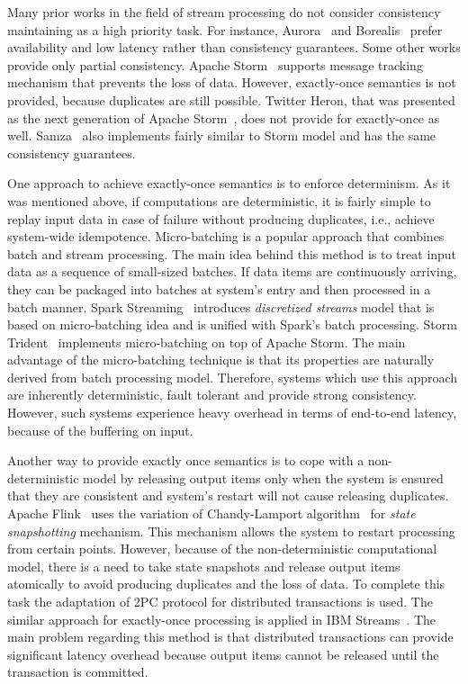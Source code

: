 
\label {fs-related-seciton}

Many prior works in the field of stream processing do not consider consistency maintaining as a high priority task. For instance, Aurora~\cite{Abadi:2003:ANM:950481.950485} and Borealis~\cite{abadi2005design} prefer availability and low latency rather than consistency guarantees. Some other works provide only partial consistency. Apache Storm~\cite{apache:storm} supports message tracking mechanism that prevents the loss of data. However, exactly-once semantics is not provided, because duplicates are still possible. Twitter Heron, that was presented as the next generation of Apache Storm~\cite{Kulkarni:2015:THS:2723372.2742788}, does not provide for exactly-once as well. Samza~\cite{Noghabi:2017:SSS:3137765.3137770} also implements fairly similar to Storm model and has the same consistency guarantees.  

One approach to achieve exactly-once semantics is to enforce determinism. As it was mentioned above, if computations are deterministic, it is fairly simple to replay input data in case of failure without producing duplicates, i.e., achieve system-wide idempotence. Micro-batching is a popular approach that combines batch and stream processing. The main idea behind this method is to treat input data as a sequence of small-sized batches. If data items are continuously arriving, they can be packaged into batches at system's entry and then processed in a batch manner. Spark Streaming~\cite{Zaharia:2012:DSE:2342763.2342773} introduces {\it discretized streams} model that is based on micro-batching idea and is unified with Spark's batch processing. Storm Trident~\cite{apache:storm:trident} implements micro-batching on top of Apache Storm. The main advantage of the micro-batching technique is that its properties are naturally derived from batch processing model. Therefore, systems which use this approach are inherently deterministic, fault tolerant and provide strong consistency. However, such systems experience heavy overhead in terms of end-to-end latency, because of the buffering on input.

Another way to provide exactly once semantics is to cope with a non-deterministic model by releasing output items only when the system is ensured that they are consistent and system's restart will not cause releasing duplicates. Apache Flink~\cite{Carbone:2017:SMA:3137765.3137777} uses the variation of Chandy-Lamport algorithm~\cite{Chandy:1985:DSD:214451.214456} for {\it state snapshotting} mechanism. This mechanism allows the system to restart processing from certain points. However, because of the non-deterministic computational model, there is a need to take state snapshots and release output items atomically to avoid producing duplicates and the loss of data. To complete this task the adaptation of 2PC protocol for distributed transactions is used. The similar approach for exactly-once processing is applied in IBM Streams~\cite{jacques2016consistent}. The main problem regarding this method is that distributed transactions can provide significant latency overhead because output items cannot be released until the transaction is committed. 

